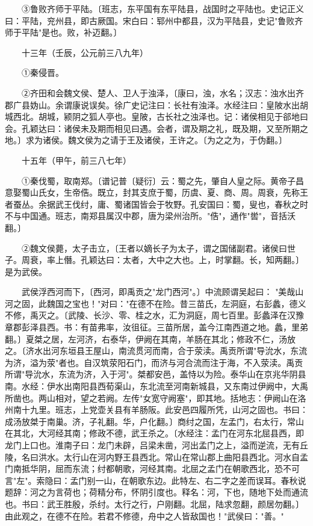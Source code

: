 　　③鲁败齐师于平陆。〔班志，东平国有东平陆县，战国时之平陆也。史记正义曰：平陆，兖州县，即古厥国。宋白曰：郓州中都县，汉为平陆县，史记"鲁败齐师于平陆"是也。败，补迈翻。〕

　　十三年（壬辰，公元前三八九年）

　　①秦侵晋。

　　②齐田和会魏文侯、楚人、卫人于浊泽，〔康曰，浊，水名；汉志：浊水出齐郡广县妫山。余谓康说误矣。徐广史记注曰：长社有浊泽。水经注曰：皇陂水出胡城西北。胡城，颍阴之狐人亭也。皇陂，古长社之浊泽也。记：诸侯相见于郤地曰会。孔颖达曰：诸侯未及期而相见曰遇。会者，谓及期之礼，既及期，又至所期之地。〕求为诸侯。魏文侯为之请于王及诸侯，王许之。〔为之之为，于伪翻。〕

　　十五年（甲午，前三八七年）

　　①秦伐蜀，取南郑。〔谱记普〔疑衍〕云：蜀之先，肇自人皇之际。黄帝子昌意娶蜀山氏女，生帝俈。既立，封其支庶于蜀，历虞、夏、商、周。周衰，先称王者蚕丛。余据武王伐纣，庸、蜀诸国皆会于牧野。孔安国曰：蜀，叟也，春秋之时不与中国通。班志，南郑县属汉中郡，唐为梁州治所。"俈"，通作"喾"，音括沃翻。〕

　　②魏文侯薨，太子击立，〔王者以嫡长子为太子，谓之国储副君。诸侯曰世子。周衰，率上僭。孔颖达曰：太者，大中之大也。上，时掌翻。长，知两翻。〕是为武侯。

　　武侯浮西河而下，〔西河，即禹贡之"龙门西河"。〕中流顾谓吴起曰： "美哉山河之固，此魏国之宝也！"对曰："在德不在险。昔三苗氏，左洞庭，右彭蠡，德义不修，禹灭之。〔武陵、长沙、零、桂之水，汇为洞庭，周七百里。彭蠡泽在汉豫章郡彭泽县西。书：有苗弗率，汝徂征。三苗所居，盖今江南西道之地。蠡，里弟翻。〕夏桀之居，左河济，右泰华，伊阙在其南，羊肠在其北；修政不仁，汤放之。〔济水出河东垣县王屋山，南流贯河而南，合于荥渎。禹贡所谓"导沇水，东流为济，溢为荥"者也。自汉筑荥阳石门，而济与河合流而注于海，不入荥渎。禹贡所谓"导沇水，东流为济，入于河"。桀都安邑，盖恃以为险。泰华山在京兆华阴县南。水经：伊水出南阳县西荀渠山，东北流至河南新城县，又东南过伊阙中，大禹所凿也。两山相对，望之若阙。左传"女宽守阙塞"，即其地。括地志：伊阙山在洛州南十九里。班志，上党壶关县有羊肠阪。此安邑四履所凭，山河之固也。书曰：成汤放桀于南巢。济，子礼翻。华，户化翻。〕商纣之国，左孟门，右太行，常山在其北，大河经其南；修政不德，武王杀之。〔水经注：孟门在河东北屈县西，即龙门上口也。淮南子曰：龙门未辟，吕梁未凿，河出孟门之上，溢而逆流，无有丘陵，名曰洪水。太行山在河内野王县西北。常山在常山郡上曲阳县西北。河水自孟门南抵华阴，屈而东流；纣都朝歌，河经其南。北屈之孟门在朝歌西北，恐不可言"左"。索隐曰：孟门别一山，在朝歌东边。此特左、右二字之差而误耳。春秋说题辞：河之为言荷也；荷精分布，怀阴引度也。释名：河，下也，随地下处而通流也。书曰：武王胜殷，杀纣。太行之行，户刚翻。北屈，陆求忽翻，颜居勿翻。〕由此观之，在德不在险。若君不修德，舟中之人皆敌国也！"武侯曰："善。"

